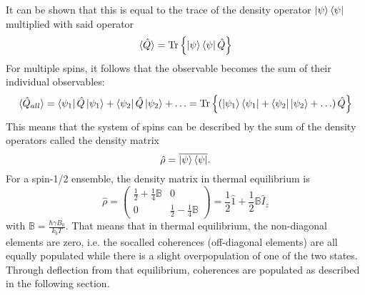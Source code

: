 	It can be shown that this is equal to the trace of the density operator
	$\ket\psi\bra\psi$multiplied with said operator
	\begin{equation}
		\braket{\hat Q} = \operatorname{Tr} \left\{\ket\psi\bra\psi\hat Q\right\}
	\end{equation}
	For multiple spins, it follows that the observable becomes the sum of their individual
	observables:
	\begin{equation}
		\braket{\hat Q_{all}}= \bra{\psi_1}\hat Q\ket{\psi_1} + \bra{\psi_2}\hat Q\ket{\psi_2} + \hdots =
		\operatorname{Tr}{\left\{\left(\ket{\psi_1}\bra{\psi_1} + \bra{\psi_2}\ket{\psi_2}+ \hdots \right) \hat Q\right\}}
	\end{equation}
	This means that the system of spins can be described by the sum of the density operators called
	the density matrix
	\begin{equation}
		\hat\rho = \overline{\ket\psi\bra\psi}.
	\end{equation}
	For a spin-1/2 ensemble, the density matrix in thermal equilibrium is
	\begin{equation}
		\hat \rho = \begin{pmatrix} \frac{1}{2}+\frac{1}{4}\mathbb{B}& 0\\ 0&
		\frac{1}{2}-\frac{1}{4}\mathbb{B}\end{pmatrix} = \frac {1}{2} \hat1 + \frac{1}{2} \mathbb{B}
		\hat I_z
	\end{equation}
	with $\mathbb{B} = \frac{\hbar\gamma B_0}{k_b T}$. That means that in thermal equilibrium, the
	non-diagonal elements are zero, i.e. the socalled coherences (off-diagonal elements) are all
	equally populated while there is a slight overpopulation of one of the two states. Through deflection from that
	equilibrium, coherences are populated as described in the following section.
